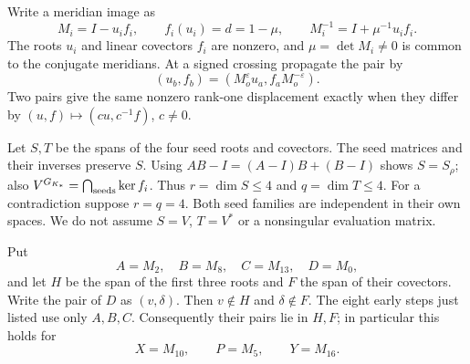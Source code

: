\documentclass[11pt]{article}
\begin{document}
Write a meridian image as
\[
 M_i=I-u_if_i,\qquad f_i(u_i)=d=1-\mu,\qquad
 M_i^{-1}=I+\mu^{-1}u_if_i.
\]
The roots $u_i$ and linear covectors $f_i$ are nonzero, and
$\mu=\det M_i\ne0$ is common to the conjugate meridians.
At a signed crossing propagate the pair by
\[
 (u_b,f_b)=(M_o^\varepsilon u_a,f_aM_o^{-\varepsilon}).
\]
Two pairs give the same nonzero rank-one displacement exactly when
they differ by $(u,f)\mapsto(cu,c^{-1}f)$, $c\ne0$.

Let $S,T$ be the spans of the four seed roots and covectors.
The seed matrices and their inverses preserve $S$.
Using $AB-I=(A-I)B+(B-I)$ shows $S=S_\rho$; also
$V^{G_{K_*}}=\bigcap_{\rm seeds}\ker f_i$.
Thus $r=\dim S\le4$ and $q=\dim T\le4$.
For a contradiction suppose $r=q=4$. Both seed families are
independent in their own spaces. We do not assume $S=V$, $T=V^*$
or a nonsingular evaluation matrix.

Put
\[
 A=M_2,\quad B=M_8,\quad C=M_{13},\quad D=M_0,
\]
and let $H$ be the span of the first three roots and $F$ the span
of their covectors. Write the pair of $D$ as $(v,\delta)$.
Then $v\notin H$ and $\delta\notin F$.
The eight early steps just listed use only $A,B,C$.
Consequently their pairs lie in $H,F$; in particular this holds for
\[
 X=M_{10},\qquad P=M_5,\qquad Y=M_{16}.
\]
\end{document}
